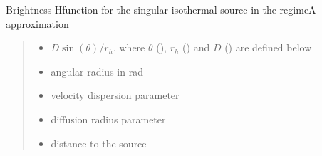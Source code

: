 \documentclass[letterpaper,10pt,english]{sphinxmanual}
\begin{document}

\begin{fulllineitems}
\label{\detokenize{diffsph.profiles:diffsph.profiles.analytics.sisbrA}}
\pysigstartsignatures
{}
\pysigstopsignatures
\sphinxAtStartPar
Brightness H\sphinxhyphen{}function for the singular isothermal source in the regime\sphinxhyphen{}A approximation
\begin{quote}\begin{description}
\begin{itemize}
\item {} 
\sphinxAtStartPar
{} \textendash{} \(D\sin(\theta)/r_h\), where \(\theta\) (), \(r_h\) () and \(D\) () are defined below

\item {} 
\sphinxAtStartPar
{} \textendash{} angular radius in rad

\item {} 
\sphinxAtStartPar
{} \textendash{} velocity dispersion parameter

\item {} 
\sphinxAtStartPar
{} \textendash{} diffusion radius parameter

\item {} 
\sphinxAtStartPar
{} \textendash{} distance to the source

\end{itemize}

\end{description}\end{quote}

\end{fulllineitems}

\end{document}
